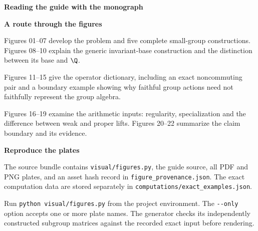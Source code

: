 \documentclass[11pt]{article}
\begin{document}
\clearpage
{\fontsize{24}{28}\selectfont\bfseries\color{Ink}Reading the guide with the monograph}\par
{}\par
\vspace{5mm}
\begin{minipage}[t]{.475\linewidth}\vspace{0pt}
{\large\bfseries\color{Teal}A route through the figures}\par
Figures 01--07 develop the problem and five complete small-group constructions. Figures 08--10 explain the generic invariant-base construction and the distinction between its base and $\Q$.

Figures 11--15 give the operator dictionary, including an exact noncommuting pair and a boundary example showing why faithful group actions need not faithfully represent the group algebra.

Figures 16--19 examine the arithmetic inputs: regularity, specialization and the difference between weak and proper lifts. Figures 20--22 summarize the claim boundary and its evidence.

{\large\bfseries\color{Teal}Reproduce the plates}\par
The source bundle contains \texttt{visual/figures.py}, the guide source, all PDF and PNG plates, and an asset hash record in \texttt{figure\_provenance.json}. The exact computation data are stored separately in \texttt{computations/exact\_examples.json}.

Run \texttt{python visual/figures.py} from the project environment. The \texttt{-{}-only} option accepts one or more plate names. The generator checks its independently constructed subgroup matrices against the recorded exact input before rendering.
\end{minipage}\hfill
\end{document}
